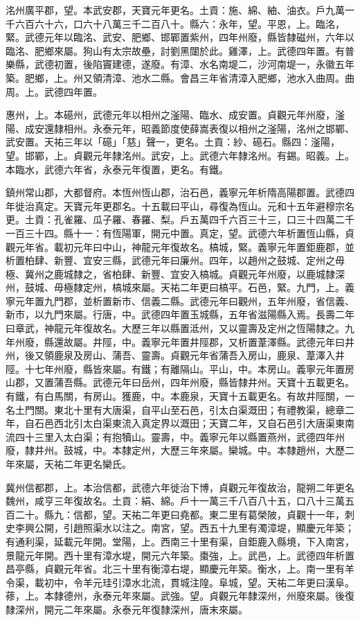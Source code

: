 \begin{pinyinscope}
 洺州廣平郡，望。本武安郡，天寶元年更名。土貢：施、綿、紬、油衣。戶九萬一千六百六十六，口六十八萬三千二百八十。縣六：永年，望。平恩，上。臨洺，緊。武德元年以臨洺、武安、肥鄉、邯鄲置紫州，四年州廢，縣皆隸磁州，六年以臨洺、肥鄉來屬。狗山有太宗故壘，討劉黑闥於此。雞澤，上。武德四年置。有普樂縣，武德初置，後陷竇建德，遂廢。有漳、水名南堤二，沙河南堤一，永徽五年築。肥鄉，上。州又領清漳、池水二縣。會昌三年省清漳入肥鄉，池水入曲周。曲周。上。武德四年置。



 惠州，上。本礠州，武德元年以相州之滏陽、臨水、成安置。貞觀元年州廢，滏陽、成安還隸相州。永泰元年，昭義節度使薛嵩表復以相州之滏陽，洺州之邯鄲、武安置。天祐三年以「礠」「慈」聲一，更名。土貢：紗、礠石。縣四：滏陽，望。邯鄲，上。貞觀元年隸洺州。武安，上。武德六年隸洺州。有錫。昭義。上。本臨水，武德六年省，永泰元年復置，更名。有鐵。



 鎮州常山郡，大都督府。本恆州恆山郡，治石邑，義寧元年析隋高陽郡置。武德四年徙治真定。天寶元年更郡名。十五載曰平山，尋復為恆山。元和十五年避穆宗名更。土貢：孔雀羅、瓜子羅、春羅、梨。戶五萬四千六百三十三，口三十四萬二千一百三十四。縣十一：有恆陽軍，開元中置。真定，望。武德六年析置恆山縣，貞觀元年省。載初元年曰中山，神龍元年復故名。槁城，緊。義寧元年置鉅鹿郡，並析置柏肆、新豐、宜安三縣，武德元年曰廉州。四年，以趙州之鼓城、定州之毋極、冀州之鹿城隸之，省柏肆、新豐、宜安入槁城。貞觀元年州廢，以鹿城隸深州，鼓城、毋極隸定州，槁城來屬。天祐二年更曰槁平。石邑，緊。九門，上。義寧元年置九門郡，並析置新市、信義二縣。武德元年曰觀州，五年州廢，省信義、新市，以九門來屬。行唐，中。武德四年置玉城縣，五年省滋陽縣入焉。長壽二年曰章武，神龍元年復故名。大歷三年以縣置泜州，又以靈壽及定州之恆陽隸之。九年州廢，縣還故屬。井陘，中。義寧元年置井陘郡，又析置葦澤縣。武德元年曰井州，後又領鹿泉及房山、蒲吾、靈壽。貞觀元年省蒲吾入房山，鹿泉、葦澤入井陘。十七年州廢，縣皆來屬。有鐵；有離隔山。平山，中。本房山。義寧元年置房山郡，又置蒲吾縣。武德元年曰岳州，四年州廢，縣皆隸井州。天寶十五載更名。有鐵，有白馬關，有房山。獲鹿，中。本鹿泉，天寶十五載更名。有故井陘關，一名土門關。東北十里有大唐渠，自平山至石邑，引太白渠溉田；有禮教渠，總章二年，自石邑西北引太白渠東流入真定界以溉田；天寶二年，又自石邑引大唐渠東南流四十三里入太白渠；有抱犢山。靈壽，中。義寧元年以縣置燕州，武德四年州廢，隸井州。鼓城，中。本隸定州，大歷三年來屬。欒城。中。本隸趙州，大歷二年來屬，天祐二年更名欒氏。



 冀州信都郡，上。本治信都，武德六年徙治下博，貞觀元年復故治，龍朔二年更名魏州，咸亨三年復故名。土貢：絹、綿。戶十一萬三千八百八十五，口八十三萬五百二十。縣九：信都，望。天祐二年更曰堯都。東二里有葛榮陂，貞觀十一年，刺史李興公開，引趙照渠水以注之。南宮，望。西五十九里有濁漳堤，顯慶元年築；有通利渠，延載元年開。堂陽，上。西南三十里有渠，自鉅鹿入縣境，下入南宮，景龍元年開。西十里有漳水堤，開元六年築。棗強，上。武邑，上。武德四年析置昌亭縣，貞觀元年省。北三十里有衡漳右堤，顯慶元年築。衡水，上。南一里有羊令渠，載初中，令羊元珪引漳水北流，貫城注隍。阜城，望。天祐二年更曰漢阜。蓚，上。本隸德州，永泰元年來屬。武強。望。貞觀元年隸深州，州廢來屬。後復隸深州，開元二年來屬。永泰元年復隸深州，唐末來屬。




\end{pinyinscope}
